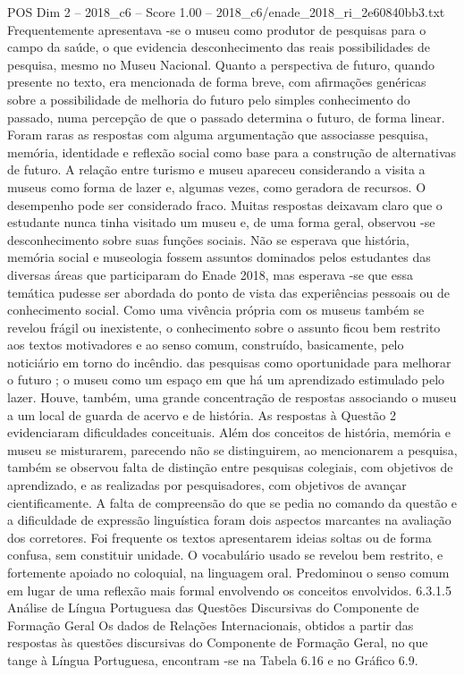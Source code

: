 \begin{textsample}{POS Dim 2 – 2018\_c6 – Score 1.00 – 2018\_c6/enade\_2018\_ri\_2e60840bb3.txt}
Frequentemente apresentava -se o museu como produtor de pesquisas para o campo da saúde, o que evidencia desconhecimento das reais possibilidades de pesquisa, mesmo no Museu Nacional.
Quanto a perspectiva de futuro, quando presente no texto, era mencionada de forma breve, com afirmações genéricas sobre a possibilidade de melhoria do futuro pelo simples conhecimento do passado, numa percepção de que o passado determina o futuro, de forma linear.
Foram raras as respostas com alguma argumentação que associasse pesquisa, memória, identidade e reflexão social como base para a construção de alternativas de futuro.
A relação entre turismo e museu apareceu considerando a visita a museus como forma de lazer e, algumas vezes, como geradora de recursos.
O desempenho pode ser considerado fraco.
Muitas respostas deixavam claro que o estudante nunca tinha visitado um museu e, de uma forma geral, observou -se desconhecimento sobre suas funções sociais.
Não se esperava que história, memória social e museologia fossem assuntos dominados pelos estudantes das diversas áreas que participaram do Enade 2018, mas esperava -se que essa temática pudesse ser abordada do ponto de vista das experiências pessoais ou de conhecimento social.
Como uma vivência própria com os museus também se revelou frágil ou inexistente, o conhecimento sobre o assunto ficou bem restrito aos textos motivadores e ao senso comum, construído, basicamente, pelo noticiário em torno do incêndio. das pesquisas como oportunidade para melhorar o futuro ; o museu como um espaço em que há um aprendizado estimulado pelo lazer.
Houve, também, uma grande concentração de respostas associando o museu a um local de guarda de acervo e de história.
As respostas à Questão 2 evidenciaram dificuldades conceituais.
Além dos conceitos de história, memória e museu se misturarem, parecendo não se distinguirem, ao mencionarem a pesquisa, também se observou falta de distinção entre pesquisas colegiais, com objetivos de aprendizado, e as realizadas por pesquisadores, com objetivos de avançar cientificamente.
A falta de compreensão do que se pedia no comando da questão e a dificuldade de expressão linguística foram dois aspectos marcantes na avaliação dos corretores.
Foi frequente os textos apresentarem ideias soltas ou de forma confusa, sem constituir unidade.
O vocabulário usado se revelou bem restrito, e fortemente apoiado no coloquial, na linguagem oral.
Predominou o senso comum em lugar de uma reflexão mais formal envolvendo os conceitos envolvidos. 6.3.1.5 Análise de Língua Portuguesa das Questões Discursivas do Componente de Formação Geral Os dados de Relações Internacionais, obtidos a partir das respostas às questões discursivas do Componente de Formação Geral, no que tange à Língua Portuguesa, encontram -se na Tabela 6.16 e no Gráfico 6.9.

\end{textsample}
